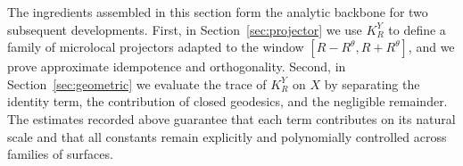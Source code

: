 The ingredients assembled in this section form the analytic backbone for two subsequent developments. First, in Section~\ref{sec:projector} we use $K_R^Y$ to define a family of microlocal projectors adapted to the window $[R-R^\theta,R+R^\theta]$, and we prove approximate idempotence and orthogonality. Second, in Section~\ref{sec:geometric} we evaluate the trace of $K_R^Y$ on $X$ by separating the identity term, the contribution of closed geodesics, and the negligible remainder. The estimates recorded above guarantee that each term contributes on its natural scale and that all constants remain explicitly and polynomially controlled across families of surfaces.
